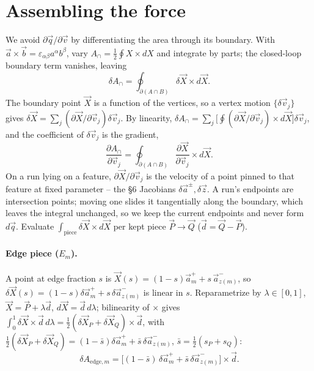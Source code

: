 \documentclass[11pt]{article}
\numberwithin{equation}{section}
\newcommand{\vv}[1]{\vec{#1}}
\newcommand{\half}{\tfrac{1}{2}}
\begin{document}
\section{Assembling the force}

We avoid $\partial\vv q/\partial\vv v$ by differentiating the area through its boundary. With $\vv
a\times\vv b=\varepsilon_{\alpha\beta}a^{\alpha}b^{\beta}$, vary $A_{\cap}=\half\oint X\times dX$ and
integrate by parts; the closed-loop boundary term vanishes, leaving
\begin{equation}
  \delta A_{\cap}=\oint_{\partial(A\cap B)}\delta\vv X\times d\vv X.
\end{equation}
The boundary point $\vv X$ is a function of the vertices, so a vertex motion $\{\delta\vv v_j\}$
gives $\delta\vv X=\sum_j(\partial\vv X/\partial\vv v_j)\delta\vv v_j$. By linearity, $\delta
A_{\cap}=\sum_j\big[\oint(\partial\vv X/\partial\vv v_j)\times d\vv X\big]\delta\vv v_j$, and the
coefficient of $\delta\vv v_j$ is the gradient,
\begin{equation}
  \frac{\partial A_{\cap}}{\partial\vv v_j}=\oint_{\partial(A\cap B)}\frac{\partial\vv X}{\partial\vv v_j}\times d\vv X.
\end{equation}
On a run lying on a feature, $\partial\vv X/\partial\vv v_j$ is the velocity of a point pinned to that
feature at fixed parameter -- the \S6 Jacobians $\delta\vv a^{\pm},\delta\vv z$. A run's endpoints are
intersection points; moving one slides it tangentially along the boundary, which leaves the integral
unchanged, so we keep the current endpoints and never form $d\vv q$. Evaluate
$\int_{\text{piece}}\delta\vv X\times d\vv X$ per kept piece $\vv P\to\vv Q$ ($\vv d=\vv Q-\vv P$).

\paragraph{Edge piece ($E_m$).} A point at edge fraction $s$ is $\vv X(s)=(1-s)\vv a^{+}_m+s\,\vv
a^{-}_{z(m)}$, so $\delta\vv X(s)=(1-s)\delta\vv a^{+}_m+s\,\delta\vv a^{-}_{z(m)}$ is linear in $s$.
Reparametrize by $\lambda\in[0,1]$, $\vv X=\vv P+\lambda\vv d$, $d\vv X=\vv d\,d\lambda$; bilinearity
of $\times$ gives $\int_0^1\delta\vv X\times\vv d\,d\lambda=\half(\delta\vv X_P+\delta\vv X_Q)\times\vv
d$, with $\half(\delta\vv X_P+\delta\vv X_Q)=(1-\bar s)\delta\vv a^{+}_m+\bar s\,\delta\vv
a^{-}_{z(m)}$, $\bar s=\half(s_P+s_Q)$:
\begin{equation}
  \delta A_{\text{edge},m}=\big[(1-\bar s)\,\delta\vv a^{+}_m+\bar s\,\delta\vv a^{-}_{z(m)}\big]\times\vv d.
\end{equation}
\end{document}
